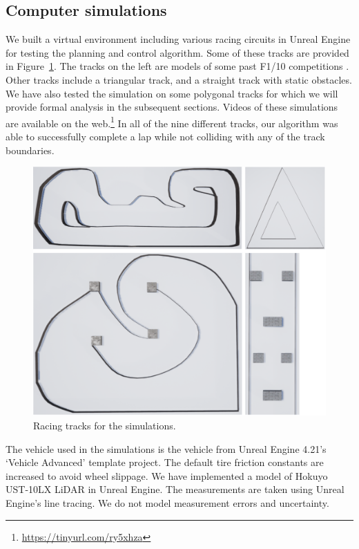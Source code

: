 \subsection{Computer simulations}

We built a virtual environment including various racing circuits in Unreal Engine for testing the planning and control algorithm.
%
Some of these tracks are provided in Figure~\ref{fig:simulation_tracks}.
%
The tracks on the left are models of some past  F1/10 competitions \cite{f1tenth}.
%
Other tracks include a triangular track, and a straight track with static obstacles.
%
We have also tested the simulation on some polygonal tracks for which we will provide formal analysis in the subsequent sections.
%
Videos of these simulations are available on the web.\footnote{\url{https://tinyurl.com/ry5xhza}}
%
In all of the nine different tracks, our algorithm was able to successfully complete a lap while not colliding with any of the track boundaries.

\begin{figure}[!t]
\centering
\includegraphics[width=0.8\columnwidth]{Figures/sim-tracks.png}
\caption{Racing tracks for the simulations.}
\label{fig:simulation_tracks}
\end{figure}

The vehicle used in the simulations is the vehicle from Unreal Engine 4.21's `Vehicle Advanced' template project.
%
The default tire friction constants are increased to avoid wheel slippage.
%
We have implemented a model of Hokuyo UST-10LX LiDAR in Unreal Engine.
%
The measurements are taken using Unreal Engine's line tracing.
%
We do not model measurement errors and uncertainty.


